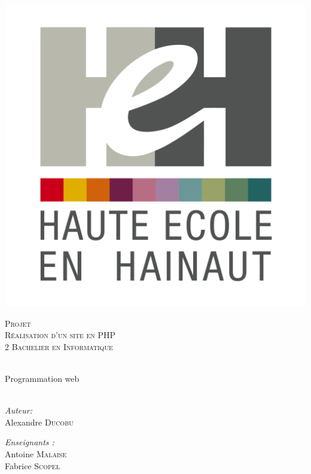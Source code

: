 \begin{center}
  \includegraphics[scale=0.12]{textures/logo/heh.pdf}

  \vspace{1cm}

  \textsc{\LARGE Projet} \\ [0.5cm]
  \textsc{\Large Réalisation d'un site en PHP} \\ [0.5cm]

  \textsc{\large 2 Bachelier en Informatique} \\ [0.2cm]

  \begingroup
   \selectfont 

  \HRule \\ [0.4cm] {
    \huge Programmation web \\ [0.2cm] 
  }
  \HRule \\ [1.3cm]
  \endgroup
  \begin{minipage}[t]{0.4 \textwidth} 
    \begin{flushleft} 
      \large \emph{Auteur:} \\ 
      Alexandre \textsc{Ducobu}
    \end{flushleft} 
  \end{minipage}
  \begin{minipage}[t]{0.4 \textwidth}
    \begin{flushright} 
      \large \emph{Enseignants :} \\ 
      Antoine \textsc{Malaise} \\
      Fabrice \textsc{Scopel}
    \end{flushright} 
  \end{minipage}


\end{center}
